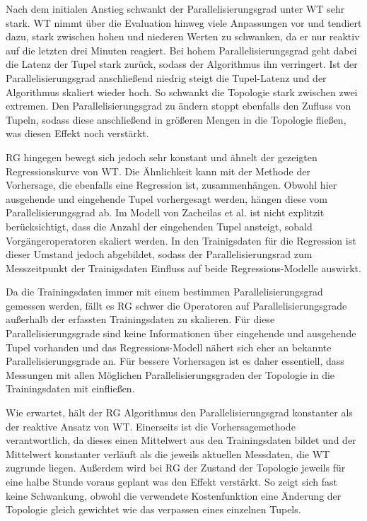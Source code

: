 Nach dem initialen Anstieg schwankt der Parallelisierungsgrad unter WT sehr stark.
WT nimmt über die Evaluation hinweg viele Anpassungen vor und tendiert dazu, stark zwischen hohen und niederen Werten zu schwanken, da er nur reaktiv auf die letzten drei Minuten reagiert.
Bei hohem Parallelisierungsgrad geht dabei die Latenz der Tupel stark zurück, sodass der Algorithmus ihn verringert.
Ist der Parallelisierungsgrad anschließend niedrig steigt die Tupel-Latenz und der Algorithmus skaliert wieder hoch.
So schwankt die Topologie stark zwischen zwei extremen.
Den Parallelisierungsgrad zu ändern stoppt ebenfalls den Zufluss von Tupeln, sodass diese anschließend in größeren Mengen in die Topologie fließen, was diesen Effekt noch verstärkt.

RG hingegen bewegt sich jedoch sehr konstant und ähnelt der gezeigten Regressionskurve von WT.
Die Ähnlichkeit kann mit der Methode der Vorhersage, die ebenfalls eine Regression ist, zusammenhängen. Obwohl hier ausgehende und eingehende Tupel vorhergesagt werden, hängen diese vom Parallelisierungsgrad ab.
Im Modell von Zacheilas et al. ist nicht explitzit berücksichtigt, dass die Anzahl der eingehenden Tupel ansteigt, sobald Vorgängeroperatoren skaliert werden.
In den Trainigsdaten für die Regression ist dieser Umstand jedoch abgebildet, sodass der Parallelisierungsrad zum Messzeitpunkt der Trainigsdaten Einfluss auf beide Regressions-Modelle auswirkt.

Da die Trainingsdaten immer mit einem bestimmen Parallelisierungsgrad gemessen werden, fällt es RG schwer die Operatoren auf Parallelisierungsgrade außerhalb der erfassten Trainingsdaten zu skalieren.
Für diese Parallelisierungsgrade sind keine Informationen über eingehende und ausgehende Tupel vorhanden und das Regressions-Modell nähert sich eher an bekannte Parallelisierungsgrade an.
Für bessere Vorhersagen ist es daher essentiell, dass Messungen mit allen Möglichen Parallelisierungsgraden der Topologie in die Trainingsdaten mit einfließen.

Wie erwartet, hält der RG Algorithmus den Parallelisierungsgrad konstanter als der reaktive Ansatz von WT.
Einerseits ist die Vorhersagemethode verantwortlich, da dieses einen Mittelwert aus den Trainingsdaten bildet und der Mittelwert konstanter verläuft als die jeweils aktuellen Messdaten, die WT zugrunde liegen.
Außerdem wird bei RG der Zustand der Topologie jeweils für eine halbe Stunde voraus geplant was den Effekt verstärkt.
So zeigt sich fast keine Schwankung, obwohl die verwendete Kostenfunktion eine Änderung der Topologie gleich gewichtet wie das verpassen eines einzelnen Tupels.

